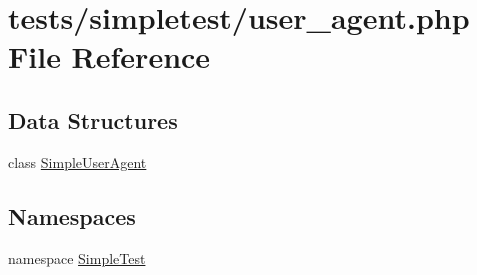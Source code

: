 \hypertarget{user__agent_8php}{\section{tests/simpletest/user\-\_\-agent.php File Reference}
\label{user__agent_8php}
}
\subsection*{Data Structures}
\begin{DoxyCompactItemize}
\item 
class \hyperlink{class_simple_user_agent}{Simple\-User\-Agent}
\end{DoxyCompactItemize}
\subsection*{Namespaces}
\begin{DoxyCompactItemize}
\item 
namespace \hyperlink{namespace_simple_test}{Simple\-Test}
\end{DoxyCompactItemize}
